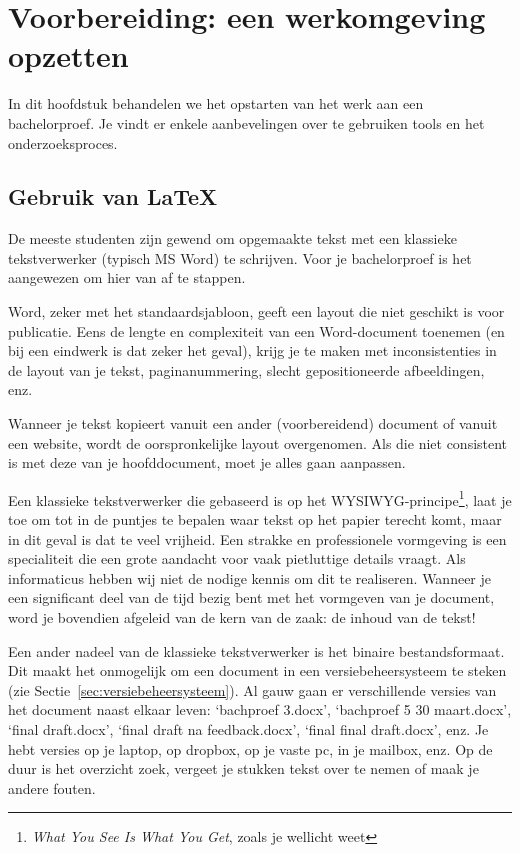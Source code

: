 \chapter{Voorbereiding: een werkomgeving opzetten}
\label{ch:voorbereiding}

In dit hoofdstuk behandelen we het opstarten van het werk aan een bachelorproef. Je vindt er enkele aanbevelingen over te gebruiken tools en het onderzoeksproces.

\section{Gebruik van {\LaTeX}}
\label{sec:gebruik-van-latex}

De meeste studenten zijn gewend om opgemaakte tekst met een klassieke tekstverwerker (typisch MS Word) te schrijven. Voor je bachelorproef is het aangewezen om hier van af te stappen.

Word, zeker met het standaardsjabloon, geeft een layout die niet geschikt is voor publicatie. Eens de lengte en complexiteit van een Word-document toenemen (en bij een eindwerk is dat zeker het geval), krijg je te maken met inconsistenties in de layout van je tekst, paginanummering, slecht gepositioneerde afbeeldingen, enz.

Wanneer je tekst kopieert vanuit een ander (voorbereidend) document of vanuit een website, wordt de oorspronkelijke layout overgenomen. Als die niet consistent is met deze van je hoofddocument, moet je alles gaan aanpassen.

Een klassieke tekstverwerker die gebaseerd is op het WYSIWYG-principe\footnote{\emph{What You See Is What You Get}, zoals je wellicht weet}, laat je toe om tot in de puntjes te bepalen waar tekst op het papier terecht komt, maar in dit geval is dat te veel vrijheid. Een strakke en professionele vormgeving is een specialiteit die een grote aandacht voor vaak pietluttige  details vraagt. Als informaticus hebben wij niet de nodige kennis om dit te realiseren. Wanneer je een significant deel van de tijd bezig bent met het vormgeven van je document, word je bovendien afgeleid van de kern van de zaak: de inhoud van de tekst!

Een ander nadeel van de klassieke tekstverwerker is het binaire bestandsformaat. Dit maakt het onmogelijk om een document in een versiebeheersysteem te steken (zie Sectie~\ref{sec:versiebeheersysteem}). Al gauw gaan er verschillende versies van het document naast elkaar leven: `bachproef 3.docx', `bachproef 5 30 maart.docx', `final draft.docx', `final draft na feedback.docx', `final final draft.docx', enz. Je hebt versies op je laptop, op dropbox, op je vaste pc, in je mailbox, enz. Op de duur is het overzicht zoek, vergeet je stukken tekst over te nemen of maak je andere fouten.


